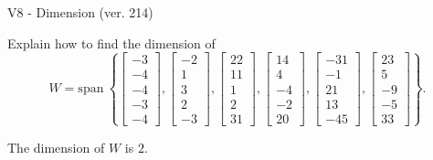 \begin{exercise}
  \begin{exerciseTitle}V8 - Dimension (ver. 214)\end{exerciseTitle}
  \begin{exerciseStatement}
    Explain how to find the dimension of 
\[W=\mathrm{span}\ \left\{\left[\begin{array}{r}
-3 \\
-4 \\
-4 \\
-3 \\
-4
\end{array}\right] , \left[\begin{array}{r}
-2 \\
1 \\
3 \\
2 \\
-3
\end{array}\right] , \left[\begin{array}{r}
22 \\
11 \\
1 \\
2 \\
31
\end{array}\right] , \left[\begin{array}{r}
14 \\
4 \\
-4 \\
-2 \\
20
\end{array}\right] , \left[\begin{array}{r}
-31 \\
-1 \\
21 \\
13 \\
-45
\end{array}\right] , \left[\begin{array}{r}
23 \\
5 \\
-9 \\
-5 \\
33
\end{array}\right]\right\}.\]



  \end{exerciseStatement}
  \begin{exerciseAnswer}
   The dimension of \(W\) is  \(2\).
  


  \end{exerciseAnswer}
\end{exercise}
